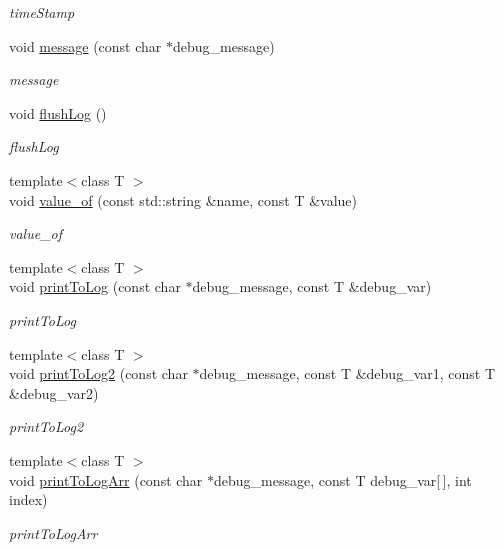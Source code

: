\begin{DoxyCompactItemize}
\begin{DoxyCompactList}\small\item\em time\-Stamp \end{DoxyCompactList}\item 
void \hyperlink{class_a_p_i2_1_1_debug_log_ad81ff9b5cfda518326d4ceb454813d82}{message} (const char $\ast$debug\-\_\-message)
\begin{DoxyCompactList}\small\item\em message \end{DoxyCompactList}\item 
\hypertarget{class_a_p_i2_1_1_debug_log_adcbe091b9a54b9b02d52e202daf8f313}{void \hyperlink{class_a_p_i2_1_1_debug_log_adcbe091b9a54b9b02d52e202daf8f313}{flush\-Log} ()}\label{class_a_p_i2_1_1_debug_log_adcbe091b9a54b9b02d52e202daf8f313}

\begin{DoxyCompactList}\small\item\em flush\-Log \end{DoxyCompactList}\item 
{\footnotesize template$<$class T $>$ }\\void \hyperlink{class_a_p_i2_1_1_debug_log_a39cdc1aee6d650284ea5acb942e32ab8}{value\-\_\-of} (const std\-::string \&name, const T \&value)
\begin{DoxyCompactList}\small\item\em value\-\_\-of \end{DoxyCompactList}\item 
{\footnotesize template$<$class T $>$ }\\void \hyperlink{class_a_p_i2_1_1_debug_log_a874b3bd6d85a86b06407ffcf67caebcf}{print\-To\-Log} (const char $\ast$debug\-\_\-message, const T \&debug\-\_\-var)
\begin{DoxyCompactList}\small\item\em print\-To\-Log \end{DoxyCompactList}\item 
{\footnotesize template$<$class T $>$ }\\void \hyperlink{class_a_p_i2_1_1_debug_log_a05d87aec9a86514496c678b874bbd012}{print\-To\-Log2} (const char $\ast$debug\-\_\-message, const T \&debug\-\_\-var1, const T \&debug\-\_\-var2)
\begin{DoxyCompactList}\small\item\em print\-To\-Log2 \end{DoxyCompactList}\item 
{\footnotesize template$<$class T $>$ }\\void \hyperlink{class_a_p_i2_1_1_debug_log_a6e4dc9deb23e60113c7fc2c1c3ddbb5d}{print\-To\-Log\-Arr} (const char $\ast$debug\-\_\-message, const T debug\-\_\-var\mbox{[}$\,$\mbox{]}, int index)
\begin{DoxyCompactList}\small\item\em print\-To\-Log\-Arr \end{DoxyCompactList}\end{DoxyCompactItemize}


